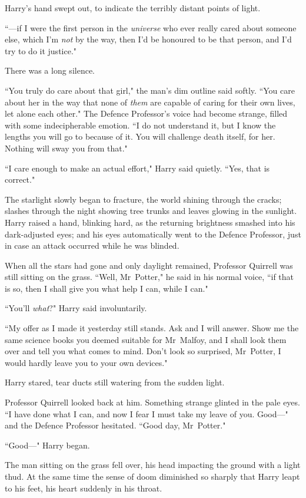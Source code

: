 Harry's hand swept out, to indicate the terribly distant points of light.

``—if I were the first person in the \emph{universe} who ever really cared about someone else, which I'm \emph{not} by the way, then I'd be honoured to be that person, and I'd try to do it justice."

There was a long silence.

``You truly do care about that girl," the man's dim outline said softly. ``You care about her in the way that none of \emph{them} are capable of caring for their own lives, let alone each other." The Defence Professor's voice had become strange, filled with some indecipherable emotion. ``I do not understand it, but I know the lengths you will go to because of it. You will challenge death itself, for her. Nothing will sway you from that."

``I care enough to make an actual effort," Harry said quietly. ``Yes, that is correct."

The starlight slowly began to fracture, the world shining through the cracks; slashes through the night showing tree trunks and leaves glowing in the sunlight. Harry raised a hand, blinking hard, as the returning brightness smashed into his dark-adjusted eyes; and his eyes automatically went to the Defence Professor, just in case an attack occurred while he was blinded.

When all the stars had gone and only daylight remained, Professor Quirrell was still sitting on the grass. ``Well, Mr~Potter," he said in his normal voice, ``if that is so, then I shall give you what help I can, while I can."

``You'll \emph{what}?" Harry said involuntarily.

``My offer as I made it yesterday still stands. Ask and I will answer. Show me the same science books you deemed suitable for Mr~Malfoy, and I shall look them over and tell you what comes to mind. Don't look so surprised, Mr~Potter, I would hardly leave you to your own devices."

Harry stared, tear ducts still watering from the sudden light.

Professor Quirrell looked back at him. Something strange glinted in the pale eyes. ``I have done what I can, and now I fear I must take my leave of you. Good—" and the Defence Professor hesitated. ``Good day, Mr~Potter."

``Good—" Harry began.

The man sitting on the grass fell over, his head impacting the ground with a light thud. At the same time the sense of doom diminished so sharply that Harry leapt to his feet, his heart suddenly in his throat.

